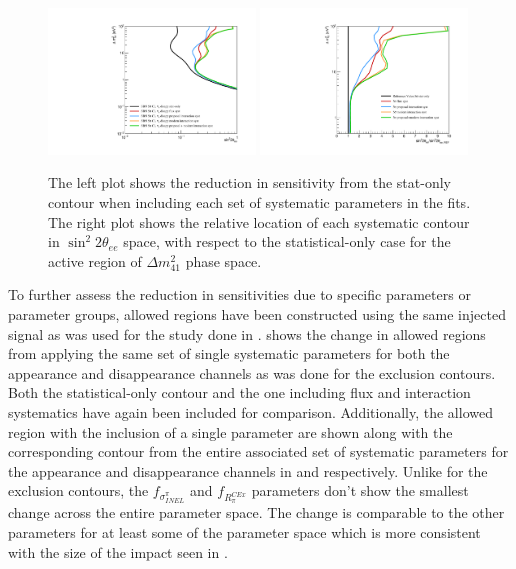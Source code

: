 \begin{figure}[h!]
    \centering
    \includegraphics[width = 0.49\textwidth]{figures-chap6/exclusion_contours/nue_disapp_syst_groups.pdf}
    \includegraphics[width = 0.49\textwidth]{figures-chap6/exclusion_contours/nue_disapp_syst_groups_ratios.pdf}
    \caption[\nue app sensitivity reduction from different systematic groups.]{The left plot shows the reduction in sensitivity from the stat-only contour when including each set of systematic parameters in the fits. The right plot shows the relative location of each systematic contour in $\sin^{2}2\theta_{ee}$ space, with respect to the statistical-only case for the active region of $\Delta m_{41}^{2}$ phase space.}
    \label{fig:nue_disapp_syst_groups}
\end{figure}

\newpage

To further assess the reduction in sensitivities due to specific parameters or parameter groups, allowed regions have been constructed using the same injected signal as was used for the study done in . 
 shows the change in allowed regions from applying the same set of single systematic parameters for both the \nue appearance and disappearance channels as was done for the exclusion contours. Both the statistical-only contour and the one including flux and interaction systematics have again been included for comparison.  Additionally, the allowed region with the inclusion of a single parameter are shown along with the corresponding contour from the entire associated set of systematic parameters for the \nue appearance and \nue disappearance channels in  and  respectively. Unlike for the exclusion contours, the  $f_{\sigma^{\pi}_{INEL}}$ and $f_{R_{\pi}^{C Ex}}$ parameters don't show the smallest change across the entire parameter space. The change is comparable to the other parameters for at least some of the parameter space which is more consistent with the size of the impact seen in .

